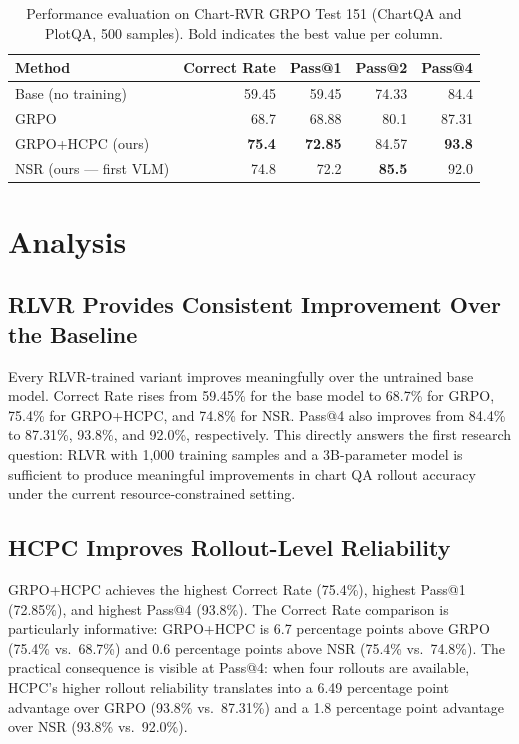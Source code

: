 \documentclass{iutbscthesis}
\begin{document}
\begin{table}[H]
    \centering
    \small
    \begin{tabular}{lrrrr}
        \toprule
        Method & Correct Rate & Pass@1 & Pass@2 & Pass@4 \\
        \midrule
        Base (no training) & 59.45 & 59.45 & 74.33 & 84.4 \\
        GRPO & 68.7 & 68.88 & 80.1 & 87.31 \\
        GRPO+HCPC (ours) & \textbf{75.4} & \textbf{72.85} & 84.57 & \textbf{93.8} \\
        NSR (ours --- first VLM) & 74.8 & 72.2 & \textbf{85.5} & 92.0 \\
        \bottomrule
    \end{tabular}
    \caption{Performance evaluation on Chart-RVR GRPO Test 151 (ChartQA and PlotQA, 500 samples). Bold indicates the best value per column.}
    \label{tab:main_results}
\end{table}

\section{Analysis}

\subsection{RLVR Provides Consistent Improvement Over the Baseline}

Every RLVR-trained variant improves meaningfully over the untrained base model. Correct Rate rises from 59.45\% for the base model to 68.7\% for GRPO, 75.4\% for GRPO+HCPC, and 74.8\% for NSR. Pass@4 also improves from 84.4\% to 87.31\%, 93.8\%, and 92.0\%, respectively. This directly answers the first research question: RLVR with 1,000 training samples and a 3B-parameter model is sufficient to produce meaningful improvements in chart QA rollout accuracy under the current resource-constrained setting.

\subsection{HCPC Improves Rollout-Level Reliability}

GRPO+HCPC achieves the highest Correct Rate (75.4\%), highest Pass@1 (72.85\%), and highest Pass@4 (93.8\%). The Correct Rate comparison is particularly informative: GRPO+HCPC is 6.7 percentage points above GRPO (75.4\% vs.\ 68.7\%) and 0.6 percentage points above NSR (75.4\% vs.\ 74.8\%). The practical consequence is visible at Pass@4: when four rollouts are available, HCPC's higher rollout reliability translates into a 6.49 percentage point advantage over GRPO (93.8\% vs.\ 87.31\%) and a 1.8 percentage point advantage over NSR (93.8\% vs.\ 92.0\%).
\end{document}
